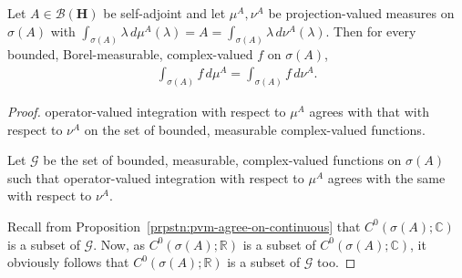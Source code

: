 \begin{proposition}
    \label{prpstn:pvm-agree-on-measurable}
    \leanok
    Let $A \in \mathcal{B}(\mathbf{H})$ be self-adjoint and let $\mu^A, \nu^A$ be projection-valued measures on $\sigma(A)$ with $\int_{\sigma(A)} \lambda \, d\mu^A(\lambda) = A = \int_{\sigma(A)} \lambda \, d\nu^A(\lambda)$. Then for every bounded, Borel-measurable, complex-valued $f$ on $\sigma(A)$,
    \begin{align}
        \int_{\sigma(A)} f \, d\mu^A = \int_{\sigma(A)} f \, d\nu^A.
    \end{align}
\end{proposition}
\begin{proof}
    \leanok
operator-valued integration with respect to $\mu^A$ agrees with that with respect to $\nu^A$ on the set of bounded, measurable complex-valued functions.

Let $\mathcal{G}$ be the set of bounded, measurable, complex-valued functions on $\sigma(A)$ such that operator-valued integration with respect to $\mu^A$ agrees with the same with respect to $\nu^A$.

Recall from Proposition~\ref{prpstn:pvm-agree-on-continuous} that $C^0(\sigma(A); \mathbb{C})$ is a subset of $\mathcal{G}$. Now, as $C^0(\sigma(A); \mathbb{R})$ is a subset of $C^0(\sigma(A); \mathbb{C})$, it obviously follows that $C^0(\sigma(A); \mathbb{R})$ is a subset of $\mathcal{G}$ too.


\end{proof}

